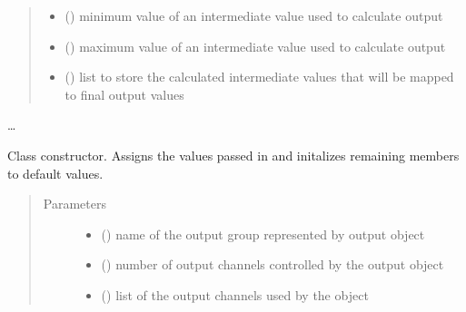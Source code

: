 \documentclass[letterpaper,10pt,english]{sphinxmanual}
\begin{document}
\begin{fulllineitems}
\begin{quote}
\begin{description}
\begin{itemize}
\item {} 
\sphinxAtStartPar
{}() \textendash{} minimum value of an intermediate 
value used to calculate output

\item {} 
\sphinxAtStartPar
{}() \textendash{} maximum value of an intermediate 
value used to calculate output

\item {} 
\sphinxAtStartPar
{}(\sphinxstyleemphasis{{[}int{]}}) \textendash{} list to store the calculated 
intermediate values that will be mapped to final output values

\end{itemize}

\end{description}\end{quote}

\sphinxAtStartPar
…

\sphinxAtStartPar
{}

\begin{fulllineitems}
\label{\detokenize{specific:EyebrowsOutput.EyebrowsOutput.__init__}}
\sphinxAtStartPar
Class constructor. Assigns the values passed in and initalizes remaining 
members to default values.
\begin{quote}\begin{description}
\item[{Parameters}] \leavevmode\begin{itemize}
\item {} 
\sphinxAtStartPar
{} () \textendash{} name of the output group represented by output object

\item {} 
\sphinxAtStartPar
{} () \textendash{} number of output channels controlled by the output 
object

\item {} 
\sphinxAtStartPar
{} (\sphinxstyleliteralemphasis{\sphinxupquote{{[}}}\sphinxstyleliteralemphasis{\sphinxupquote{{]}}}) \textendash{} list of the output channels used by the object


\end{itemize}
\end{description}
\end{quote}
\end{fulllineitems}
\end{fulllineitems}
\end{document}

